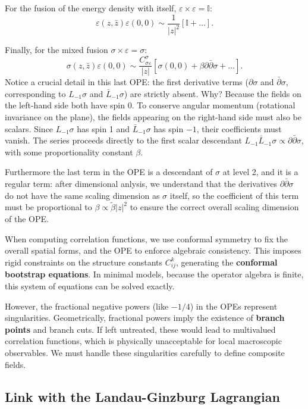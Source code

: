 For the fusion of the energy density with itself, \(\varepsilon \times \varepsilon = \mathbb{I}\):
\[
    \varepsilon(z, \bar{z})\varepsilon(0,0) \sim \frac{1}{|z|^2} \left[ \mathbb{I} + \dots \right].
\]

Finally, for the mixed fusion \(\sigma \times \varepsilon = \sigma\):
\[
    \sigma(z, \bar{z})\varepsilon(0,0) \sim \frac{C_{\sigma\varepsilon}^\sigma}{|z|} \left[ \sigma(0,0) + \beta \partial\bar{\partial}\sigma + \dots \right].
\]
Notice a crucial detail in this last OPE: the first derivative terms (\(\partial\sigma\) and \(\bar{\partial}\sigma\), corresponding to \(L_{-1}\sigma\) and \(\bar{L}_{-1}\sigma\)) are strictly absent. Why? Because the fields on the left-hand side both have spin 0. To conserve angular momentum (rotational invariance on the plane), the fields appearing on the right-hand side must also be scalars. Since \(L_{-1}\sigma\) has spin 1 and \(\bar{L}_{-1}\sigma\) has spin \(-1\), their coefficients must vanish. The series proceeds directly to the first scalar descendant \(L_{-1}\bar{L}_{-1}\sigma \propto \partial\bar{\partial}\sigma\), with some proportionality constant \(\beta\).

Furthermore the last term in the OPE is a descendant of \(\sigma\) at level 2, and it is a regular term: after dimensional anlysis, we understand that the derivatives \(\partial\bar{\partial}\sigma\) do not have the same scaling dimension as \(\sigma\) itself, so the coefficient of this term must be proportional to \(\beta \propto \tilde{\beta} \vert z \vert^2 \) to ensure the correct overall scaling dimension of the OPE.

When computing correlation functions, we use conformal symmetry to fix the overall spatial forms, and the OPE to enforce algebraic consistency. This imposes rigid constraints on the structure constants \(C_{ij}^k\), generating the \textbf{conformal bootstrap equations}. In minimal models, because the operator algebra is finite, this system of equations can be solved exactly.

However, the fractional negative powers (like \(-1/4\)) in the OPEs represent singularities. Geometrically, fractional powers imply the existence of \textbf{branch points} and branch cuts. If left untreated, these would lead to multivalued correlation functions, which is physically unacceptable for local macroscopic observables. We must handle these singularities carefully to define composite fields.

\subsection{Link with the Landau-Ginzburg Lagrangian}

